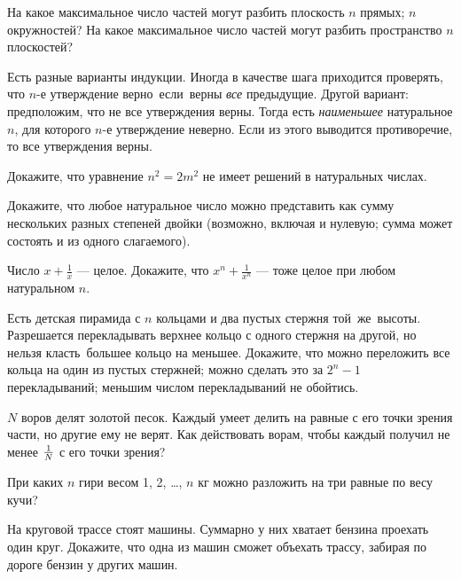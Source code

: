 \documentclass[12pt,a4paper]{article}
\begin{document}
На какое максимальное число частей могут разбить плоскость
 $n$ прямых;  $n$ окружностей?
%
 На какое максимальное число частей могут разбить пространство
$n$ плоскостей?

\smallskip

{\footnotesize
\noindent
Есть разные варианты индукции. Иногда в качестве шага
приходится проверять, что $n$-е
утверждение верно~\hbox{если}~верны {\em все} предыдущие. Другой
вариант: предположим, что не все утверждения верны. Тогда
есть {\em наименьшее} на\-ту\-ра\-ль\-ное $n$, для которого $n$-е
утверждение неверно. Если из этого выводится противоречие,
то все утверждения верны.

}

\smallskip

Докажите, что уравнение $n^2=2m^2$ не имеет решений в
натуральных числах.

Докажите, что любое натуральное число можно представить как сумму нескольких
разных степеней двойки (возможно, включая и нулевую; сумма может состоять и из одного слагаемого).

Число $\displaystyle x+\frac1x$ --- целое.
Докажите, что
$\displaystyle x^n+\frac1{x^n}$ --- тоже целое при любом
натуральном $n$.


Есть детская пирамида с $n$ кольцами и два пустых стержня
той~же~высоты.
Разрешается перекладывать верхнее кольцо с одного стержня на
другой, но нельзя класть~большее кольцо на меньшее.
Докажите, что
 можно переложить все кольца на один из пустых стержней;
 можно сделать это за $2^n-1$ перекладываний;
 меньшим числом перекладываний не обойтись.

$N$ воров делят золотой песок. Каждый умеет делить на равные с его точки зрения части, но другие ему не верят.  Как действовать ворам,
чтобы каждый получил не менее $1\over N$ с его точки зрения?

При каких $n$ гири весом 1, 2, \dots, $n$ кг
можно разложить на три равные по весу кучи?


На круговой трассе стоят машины.
Суммарно у них хватает бензина проехать один круг.
Докажите, что одна из машин сможет объехать трассу,
забирая по дороге бензин у других машин.
\end{document}

